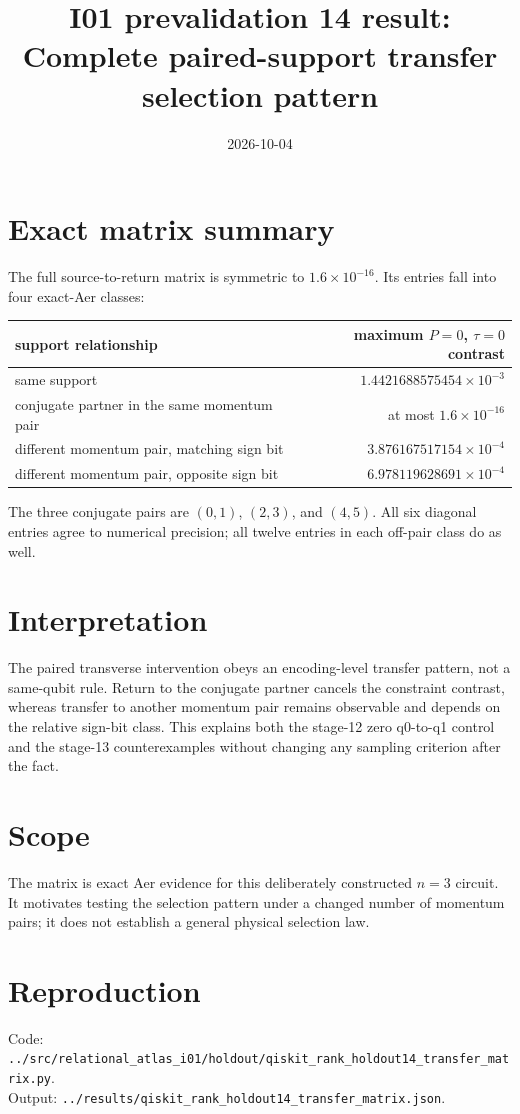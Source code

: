 \documentclass[11pt]{article}
\begin{document}
\title{I01 prevalidation 14 result:\\Complete paired-support transfer selection pattern}
\date{2026-10-04}
\maketitle

\section*{Exact matrix summary}
The full source-to-return matrix is symmetric to $1.6\times10^{-16}$. Its entries
fall into four exact-Aer classes:
\begin{center}
\begin{tabular}{lr}
\toprule
support relationship & maximum $P=0$, $\tau=0$ contrast\\
\midrule
same support & $1.4421688575454\times10^{-3}$\\
conjugate partner in the same momentum pair & at most $1.6\times10^{-16}$\\
different momentum pair, matching sign bit & $3.876167517154\times10^{-4}$\\
different momentum pair, opposite sign bit & $6.978119628691\times10^{-4}$\\
\bottomrule
\end{tabular}
\end{center}
The three conjugate pairs are $(0,1)$, $(2,3)$, and $(4,5)$. All six diagonal
entries agree to numerical precision; all twelve entries in each off-pair class do
as well.

\section*{Interpretation}
The paired transverse intervention obeys an encoding-level transfer pattern, not a
same-qubit rule. Return to the conjugate partner cancels the constraint contrast,
whereas transfer to another momentum pair remains observable and depends on the
relative sign-bit class. This explains both the stage-12 zero q0-to-q1 control and
the stage-13 counterexamples without changing any sampling criterion after the fact.

\section*{Scope}
The matrix is exact Aer evidence for this deliberately constructed $n=3$ circuit.
It motivates testing the selection pattern under a changed number of momentum pairs;
it does not establish a general physical selection law.

\section*{Reproduction}
Code: \texttt{../src/relational\_atlas\_i01/holdout/qiskit\_rank\_holdout14\_transfer\_matrix.py}.\\
Output: \texttt{../results/qiskit\_rank\_holdout14\_transfer\_matrix.json}.
\end{document}
